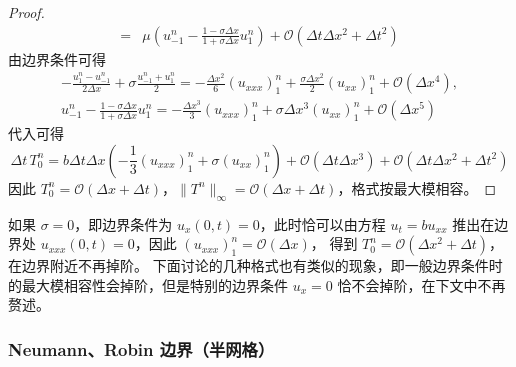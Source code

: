 \begin{proof}
\begin{align*}
        ={}                    & \mu\left(u_{-1}^n - \frac{1-\sigma \Delta x}{1+\sigma \Delta x} u_1^n\right)
        + \mathcal{O}(\Delta t \Delta x^2 + \Delta t^2)
    \end{align*}
    由边界条件可得
    \begin{gather*}
        - \frac{u_{1}^{n}-u_{-1}^{n}}{2\Delta x} + \sigma \frac{u_{-1}^n + u_1^n}2 =
        -\frac{\Delta x^2}6 (u_{xxx})_1^n
        + \frac{\sigma \Delta x^2}2 (u_{xx})_1^n
        + \mathcal{O}(\Delta x^4),\\
        u_{-1}^n - \frac{1-\sigma \Delta x}{1+\sigma \Delta x} u_1^n =
        -\frac{\Delta x^3}3 (u_{xxx})_1^n
        +  \sigma \Delta x^3  (u_{xx})_1^n
        + \mathcal{O}(\Delta x^5)
    \end{gather*}
    代入可得
    \[
        \Delta t\, T_0^{n} ={}  b \Delta t \Delta x \left( -\frac13 (u_{xxx})_1^n +\sigma (u_{xx})_1^n \right)
        + \mathcal{O}(\Delta t\Delta x^3) + \mathcal{O}(\Delta t \Delta x^2 + \Delta t^2)
    \]
    因此 $T_0^n = \mathcal{O}(\Delta x + \Delta t)$，$\|T^n\|_{\infty} = \mathcal{O}(\Delta x + \Delta t)$，格式按最大模相容。
\end{proof}

\begin{remark}
    如果 $\sigma = 0$，即边界条件为 $u_x(0,t) = 0$，此时恰可以由方程 $u_t = b u_{xx}$ 推出在边界处 $u_{xxx}(0,t) = 0$，因此 $(u_{xxx})_1^n = \mathcal{O}(\Delta x)$，
    得到 $T_0^n = \mathcal{O}(\Delta x^2 + \Delta t)$，在边界附近不再掉阶。
    下面讨论的几种格式也有类似的现象，即一般边界条件时的最大模相容性会掉阶，但是特别的边界条件 $u_x = 0$ 恰不会掉阶，在下文中不再赘述。
\end{remark}


\subsubsection{Neumann、Robin 边界（半网格）}

